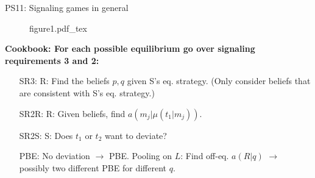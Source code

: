 \begin{frame}{PS11: Signaling games in general}
\begin{multicols}{2}
\begin{itemize}
      \end{itemize}
      \vfill\null\columnbreak
      \begin{figure}[!h]
        \center\def\svgwidth{\columnwidth}
        {figure1.pdf_tex}
      \end{figure} \vspace{-6pt}
      \textbf{Cookbook: For each possible equilibrium go over signaling requirements 3 and 2:}\vspace{-6pt}
      \begin{itemize}
        \item[SR3:] R: Find the beliefs $p,q$ given S's eq. strategy. (Only consider beliefs that are consistent with S's eq. strategy.)
        \item[SR2R:] \vspace{-2pt} R: Given beliefs, find $a(m_j|\mu(t_1|m_j))$.
        \item[SR2S:] \vspace{-2pt} S: Does $t_1$ or $t_2$ want to deviate?
        \item[PBE:]  \vspace{-2pt} No deviation $\rightarrow$ PBE. Pooling on $L$: Find off-eq. $a(R|q)$ $\rightarrow$ possibly two different PBE for different $q$.
      \end{itemize}
      \vfill\null
    \end{multicols}
\end{frame}
